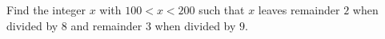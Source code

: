 Find the integer $x$ with $100<x<200$ such that $x$ leaves remainder $2$ when divided by $8$ and remainder $3$ when divided by $9$.
